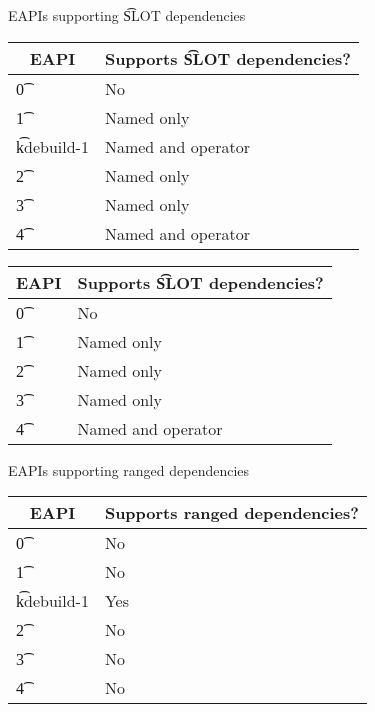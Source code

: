 \begin{centertable}{EAPIs supporting \t{SLOT} dependencies} \label{tab:slot-deps-table}
\IFKDEBUILDELSE
{
    \begin{tabular}{ l l }
        \toprule
            \multicolumn{1}{c}{\textbf{EAPI}} &
            \multicolumn{1}{c}{\textbf{Supports \t{SLOT} dependencies?}} \\
            \midrule
    \t{0} & No \\
    \t{1} & Named only \\
    \t{kdebuild-1} & Named and operator \\
    \t{2} & Named only \\
    \t{3} & Named only \\
    \t{4} & Named and operator \\
    \bottomrule
    \end{tabular}
}{
    \begin{tabular}{ l l }
        \toprule
            \multicolumn{1}{c}{\textbf{EAPI}} &
            \multicolumn{1}{c}{\textbf{Supports \t{SLOT} dependencies?}} \\
            \midrule
    \t{0} & No \\
    \t{1} & Named only \\
    \t{2} & Named only \\
    \t{3} & Named only \\
    \t{4} & Named and operator \\
    \bottomrule
    \end{tabular}
}
\end{centertable}

\IFKDEBUILDELSE
{
    \begin{centertable}{EAPIs supporting ranged dependencies} \label{tab:range-deps-table}
    \begin{tabular}{ l l }
        \toprule
        \multicolumn{1}{c}{\textbf{EAPI}} &
        \multicolumn{1}{c}{\textbf{Supports ranged dependencies?}} \\
        \midrule
    \t{0} & No \\
    \t{1} & No \\
    \t{kdebuild-1} & Yes \\
    \t{2} & No \\
    \t{3} & No \\
    \t{4} & No \\
    \bottomrule
    \end{tabular}
    \end{centertable}
}{
}

